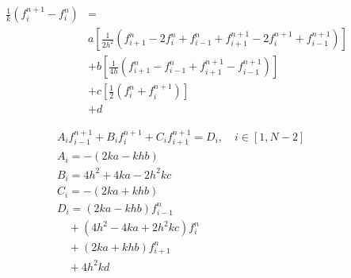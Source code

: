 \documentclass{article}
\begin{document}
    \begin{equation}
        \begin{split}
            \frac{1}{k}\left(f_i^{n+1} - f_i^n\right) &=
            \\
            & a \left[
                \frac{1}{2h^2} \left( f_{i+1}^n - 2f_i^{n} + f_{i-1}^n
                     + f_{i+1}^{n+1} - 2f_i^{n+1} +f_{i-1}^{n+1} \right)
                     \right]
            \\
            & + b \left[ 
            \frac{1}{4h}
                \left( f_{i+1}^n - f_{i-1}^n + f_{i+1}^{n+1} - f_{i-1}^{n+1} \right)
                     \right]
            \\
            & + c \left[ 
                \frac{1}{2} \left( f_i^n + f_i^{n+1} \right)
                     \right]
            \\
            & + d
        \end{split}
    \end{equation}

    \begin{equation}
        \begin{split}
            &A_i f_{i-1}^{n+1} + B_i f_i^{n+1} + C_i f_{i+1}^{n+1} = D_i, \quad i \in [1, N-2]
            \\
            &A_i = -(2ka - khb)
            \\
            &B_i = 4h^2 + 4ka - 2h^2kc
            \\
            &C_i = -( 2ka + khb )
            \\
            &D_i = (2ka - khb) f_{i-1}^{n}
            \\
            &\quad + (4h^2 - 4ka + 2h^2kc) f_i^n 
            \\
            &\quad + (2ka + khb) f_{i+1}^{n}
            \\
            &\quad + 4h^2kd
        \end{split}
    \end{equation}
\end{document}
